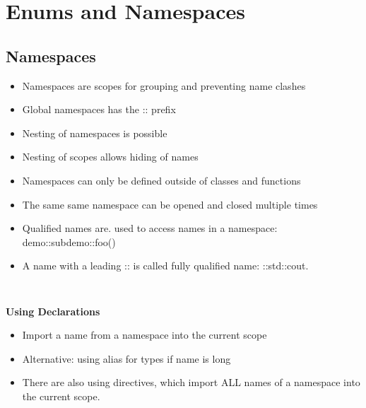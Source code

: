 
\section{Enums and Namespaces}

\subsection{Namespaces}
\begin{itemize}
  \itemsep -0.5em 
  \item Namespaces are scopes for grouping and preventing name clashes
  \item Global namespaces has the :: prefix
  \item Nesting of namespaces is possible
  \item Nesting of scopes allows hiding of names
  \item Namespaces can only be defined outside of classes and functions
  \item The same same namespace can be opened and closed multiple times
  \item Qualified names are. used to access names in a namespace: demo::subdemo::foo()
  \item A name with a leading :: is called fully qualified name: ::std::cout.
\end{itemize}
\begin{lstlisting}
	
\end{lstlisting}

\textbf{Using Declarations}
\begin{itemize}
  \itemsep -0.5em 
  \item Import a name from a namespace into the current scope
  \item Alternative: using alias for types if name is long
  \item There are also using directives, which import ALL names of a namespace into the current scope.
\end{itemize}

